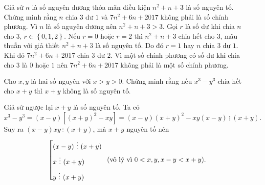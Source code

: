 \begin{ex}
Giả sử $n$ là số nguyên dương thỏa mãn điều kiện $n^2+n+3$ là số nguyên tố. Chứng minh rằng $n$ chia $3$ dư $1$ và $7n^2+6n+2017$ không phải là số chính phương.
	\loigiai
	{
		Vì $n$ là số nguyên dương nên $n^2+n+3>3$.
			Gọi $r$ là số dư khi chia $n$ cho $3$, $r\in \left\{ 0, 1, 2 \right\}$.                                                
			Nếu $r=0$ hoặc $r=2$ thì $n^2+n+3$ chia hết cho $3$, mâu thuẫn với giả thiết $n^2+n+3$ là số nguyên tố.
			Do đó $r=1$ hay $n$ chia $3$ dư $1$.
			Khi đó $7n^2+6n+2017$ chia $3$ dư $2$. 
			Vì một số chính phương có số dư khi chia cho $3$ là $0$ hoặc $1$
			nên $7n^2+6n+2017$ không phải là một số chính phương.        
	}
\end{ex}
\begin{ex}
	Cho $x, y$ là hai số nguyên với $x>y>0$.
	 Chứng minh rằng nếu $x^3-y^3$ chia hết cho $x+y$ thì $x+y$ không là số nguyên tố.
		
	\loigiai
	{Giả sử ngược lại $x+y$ là số nguyên tố. Ta có
			\[x^3-y^3=(x-y)\left[ (x+y)^2-xy \right]=(x-y)(x+y)^2-xy(x-y) \  \vdots \ (x+y).\]
			Suy ra $(x-y)xy \  \vdots \ (x+y)$, mà $x+y$ nguyên tố nên $$\hoac{& (x-y) \  \vdots \ (x+y) \\ & x \  \vdots \ (x+y) \\ & y \  \vdots \ (x+y)} \,\,\, \text{(vô lý vì $0 < x, y, x-y < x+y$).}$$
	}
\end{ex}
